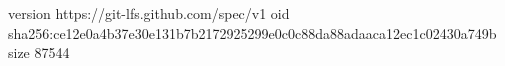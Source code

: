 version https://git-lfs.github.com/spec/v1
oid sha256:ce12e0a4b37e30e131b7b2172925299e0c0c88da88adaaca12ec1c02430a749b
size 87544
